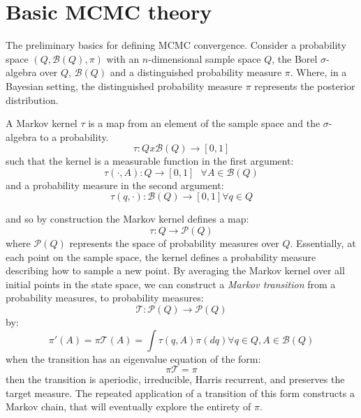 \section{Basic MCMC theory}
\label{sec:mcmctheory}
The preliminary basics for defining MCMC convergence. Consider a probability space $(Q, \mathcal{B}(Q), \pi)$ with an $n$-dimensional sample space $Q$, the Borel $\sigma$-algebra over $Q$, $\mathcal{B}(Q)$ and a distinguished probability measure $\pi$. Where, in a Bayesian setting, the distinguished probability measure $\pi$ represents the posterior distribution. 

\begin{defn}A Markov kernel $\tau$ is a map from an element of the sample space and the $\sigma$-algebra to a probability.
\begin{equation*}
\tau : Q x \mathcal{B}(Q) \rightarrow [0,1]
\end{equation*}
such that the kernel is a measurable function in the first argument:
\begin{equation*}
\tau(\cdot,A) : Q \rightarrow [0,1] \textbf{ $\forall A \in \mathcal{B}(Q)$}
\end{equation*}
and a probability measure in the second argument:
\begin{equation*}
\tau(q,\cdot) : \mathcal{B}(Q) \rightarrow [0,1] \textbf{$\forall q \in Q$}
\end{equation*}
\end{defn}
and so by construction the Markov kernel defines a map:
\begin{equation*}
\tau : Q \rightarrow \mathcal{P}(Q)
\end{equation*}
where $\mathcal{P}(Q)$ represents the space of probability measures over $Q$. Essentially, at each point on the sample space, the kernel defines a probability measure describing how to sample a new point. 
By averaging the Markov kernel over all initial points in the state space, we can construct a \textit{Markov transition} from a probability measures, to probability measures:
\begin{equation*}
\mathcal{T} : \mathcal{P}(Q) \rightarrow \mathcal{P}(Q)
\end{equation*}
by:
\begin{equation*}
\pi'(A) = \pi \mathcal{T}(A) = \int\tau(q,A)\pi(dq) \textbf{$\forall q \in Q, A \in \mathcal{B}(Q)$}
\end{equation*}
when the transition has an eigenvalue equation of the form:
\begin{equation*}
\pi\mathcal{T} = \pi
\end{equation*}
then the transition is aperiodic, irreducible, Harris recurrent, and preserves the target measure. The repeated application of a transition of this form constructs a Markov chain, that will eventually explore the entirety of $\pi$. 